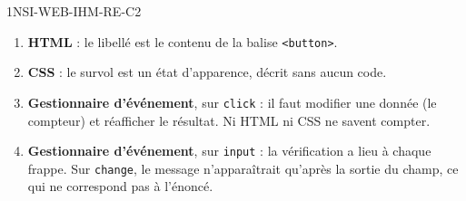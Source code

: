 \begin{corrige}{1NSI-WEB-IHM-RE-C2}
\begin{enumerate}
  \item \textbf{HTML} : le libellé est le contenu de la balise \lstinline{<button>}.
  \item \textbf{CSS} : le survol est un état d'apparence, décrit sans aucun code.
  \item \textbf{Gestionnaire d'événement}, sur \lstinline{click} : il faut modifier une donnée
        (le compteur) et réafficher le résultat. Ni HTML ni CSS ne savent compter.
  \item \textbf{Gestionnaire d'événement}, sur \lstinline{input} : la vérification a lieu à
        chaque frappe. Sur \lstinline{change}, le message n'apparaîtrait qu'après la sortie du
        champ, ce qui ne correspond pas à l'énoncé.
\end{enumerate}
\end{corrige}
